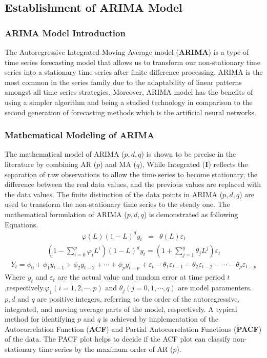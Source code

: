 \documentclass[12pt]{article}  %
\begin{document}
\subsection{Establishment of ARIMA Model}
\subsubsection{ARIMA Model Introduction}
The Autoregressive Integrated Moving Average model (\textbf{ARIMA}) is a type of time series forecasting model that allows us to transform our non-stationary time series into a stationary time series after finite difference processing. ARIMA is the most common in the series family due to the adaptability of linear patterns amongst
all time series strategies. Moreover, ARIMA model has the benefits of using a simpler algorithm and being
a studied technology in comparison to the second generation of forecasting methods which is the artificial neural
networks.
\subsubsection{Mathematical Modeling of ARIMA}
The mathematical model of ARIMA ($p, d, q$) is shown to be precise in the literature by combining AR ($p$)
and MA ($q$), While Integrated (\textbf{I}) reflects the separation of raw observations to allow the time series to become
stationary, the difference between the real data values, and the previous values are replaced with the data values.
The finite distinction of the data points in ARIMA ($p, d, q$) are used to transform the non-stationary time series to
the steady one. The mathematical formulation of ARIMA ($p, d, q$) is demonstrated as following Equations.
\begin{eqnarray}
	\varphi (L)(1-L)^dy_t & = & \theta (L)\varepsilon _t
\end{eqnarray}
\begin{eqnarray}
	(1-\sum_{i=0}^{p}\varphi _iL^i)(1-L)^dy_t=(1+\sum_{j=1}^q\theta_jL^j)\varepsilon_t
\end{eqnarray}
\begin{eqnarray}
	Y_t=\phi _0+\phi_1y_{t-1}+\phi_2y_{t-2}+\cdots +\phi_py_{t-p}+\varepsilon _t-\theta_1\varepsilon_{t-1}-\theta_2\varepsilon_{t-2}-\cdots-\theta_p\varepsilon_{t-p}
\end{eqnarray}
Where $y_t$ and $\varepsilon_t$ are the actual value and random error at time period $t$,respectively.$\varphi_1(i=1,2,\cdots ,p)$ and $\theta_j(j=0,1,\cdots ,q)$ are model paramenters. $p,d$ and $q$ are positive integers, referring to the order of the autoregressive, integrated, and moving average parts of the model, respectively. A typical method for identifying $p$ and $q$ is achieved by implementation of the Autocorrelation Function (\textbf{ACF}) and Partial Autocorrelation Functions (\textbf{PACF}) of the data.
The PACF plot helps to decide if the ACF plot can classify non-stationary time series by the maximum order of
AR ($p$).
\end{document}
